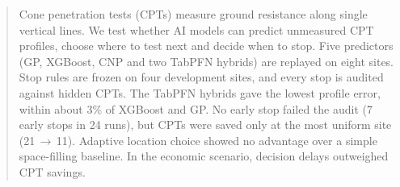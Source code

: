 \begin{abstract}
\noindent Cone penetration tests (CPTs) measure ground resistance along single vertical lines. We test whether
AI models can predict unmeasured CPT profiles, choose where to test next and decide when to stop. Five
predictors (GP, XGBoost, CNP and two TabPFN hybrids) are replayed on eight sites. Stop rules are frozen on
four development sites, and every stop is audited against hidden CPTs. The TabPFN hybrids gave the lowest
profile error, within about 3\% of XGBoost and GP. No early stop failed the audit (7 early stops in 24
runs), but CPTs were saved only at the most uniform site (21\,$\rightarrow$\,11). Adaptive location choice
showed no advantage over a simple space-filling baseline. In the economic scenario, decision delays
outweighed CPT savings.
\end{abstract}
